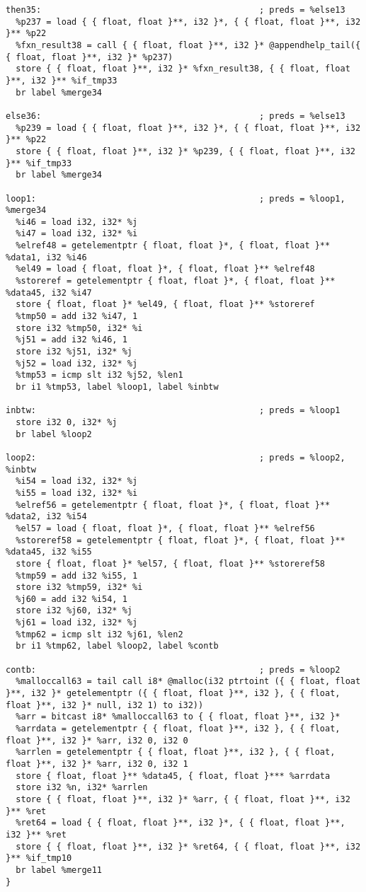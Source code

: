 \documentclass[main.tex]{subfiles}
\begin{document}
{\begin{lstlisting}
then35:                                           ; preds = %else13
  %p237 = load { { float, float }**, i32 }*, { { float, float }**, i32 }** %p22
  %fxn_result38 = call { { float, float }**, i32 }* @appendhelp_tail({ { float, float }**, i32 }* %p237)
  store { { float, float }**, i32 }* %fxn_result38, { { float, float }**, i32 }** %if_tmp33
  br label %merge34

else36:                                           ; preds = %else13
  %p239 = load { { float, float }**, i32 }*, { { float, float }**, i32 }** %p22
  store { { float, float }**, i32 }* %p239, { { float, float }**, i32 }** %if_tmp33
  br label %merge34

loop1:                                            ; preds = %loop1, %merge34
  %i46 = load i32, i32* %j
  %i47 = load i32, i32* %i
  %elref48 = getelementptr { float, float }*, { float, float }** %data1, i32 %i46
  %el49 = load { float, float }*, { float, float }** %elref48
  %storeref = getelementptr { float, float }*, { float, float }** %data45, i32 %i47
  store { float, float }* %el49, { float, float }** %storeref
  %tmp50 = add i32 %i47, 1
  store i32 %tmp50, i32* %i
  %j51 = add i32 %i46, 1
  store i32 %j51, i32* %j
  %j52 = load i32, i32* %j
  %tmp53 = icmp slt i32 %j52, %len1
  br i1 %tmp53, label %loop1, label %inbtw

inbtw:                                            ; preds = %loop1
  store i32 0, i32* %j
  br label %loop2

loop2:                                            ; preds = %loop2, %inbtw
  %i54 = load i32, i32* %j
  %i55 = load i32, i32* %i
  %elref56 = getelementptr { float, float }*, { float, float }** %data2, i32 %i54
  %el57 = load { float, float }*, { float, float }** %elref56
  %storeref58 = getelementptr { float, float }*, { float, float }** %data45, i32 %i55
  store { float, float }* %el57, { float, float }** %storeref58
  %tmp59 = add i32 %i55, 1
  store i32 %tmp59, i32* %i
  %j60 = add i32 %i54, 1
  store i32 %j60, i32* %j
  %j61 = load i32, i32* %j
  %tmp62 = icmp slt i32 %j61, %len2
  br i1 %tmp62, label %loop2, label %contb

contb:                                            ; preds = %loop2
  %malloccall63 = tail call i8* @malloc(i32 ptrtoint ({ { float, float }**, i32 }* getelementptr ({ { float, float }**, i32 }, { { float, float }**, i32 }* null, i32 1) to i32))
  %arr = bitcast i8* %malloccall63 to { { float, float }**, i32 }*
  %arrdata = getelementptr { { float, float }**, i32 }, { { float, float }**, i32 }* %arr, i32 0, i32 0
  %arrlen = getelementptr { { float, float }**, i32 }, { { float, float }**, i32 }* %arr, i32 0, i32 1
  store { float, float }** %data45, { float, float }*** %arrdata
  store i32 %n, i32* %arrlen
  store { { float, float }**, i32 }* %arr, { { float, float }**, i32 }** %ret
  %ret64 = load { { float, float }**, i32 }*, { { float, float }**, i32 }** %ret
  store { { float, float }**, i32 }* %ret64, { { float, float }**, i32 }** %if_tmp10
  br label %merge11
}


\end{lstlisting}}
\end{document}
